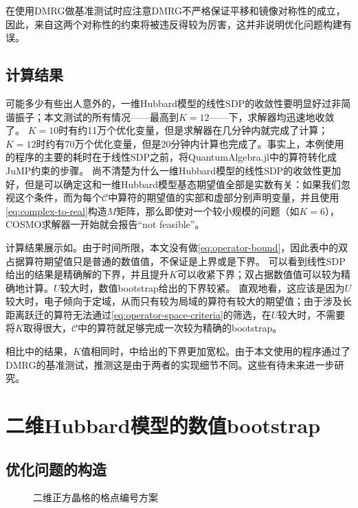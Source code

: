 \documentclass[oneside]{fduthesis}
\begin{document}
在使用DMRG做基准测试时应注意DMRG不严格保证平移和镜像对称性的成立，因此，来自这两个对称性的约束将被违反得较为厉害，这并非说明优化问题构建有误。

\subsection{计算结果}

可能多少有些出人意外的，一维Hubbard模型的线性SDP的收敛性要明显好过非简谐振子；本文测试的所有情况——最高到$K=12$——下，求解器均迅速地收敛了。
$K=10$时有约11万个优化变量，但是求解器在几分钟内就完成了计算；$K=12$时约有70万个优化变量，但是20分钟内计算也完成了。事实上，本例使用的程序的主要的耗时在于线性SDP之前，将QuantumAlgebra.jl中的算符转化成JuMP约束的步骤。
尚不清楚为什么一维Hubbard模型的线性SDP的收敛性更加好，但是可以确定这和一维Hubbard模型基态期望值全部是实数有关：如果我们忽视这个条件，而为每个$\mathcal{C}$中算符的期望值的实部和虚部分别声明变量，并且使用\eqref{eq:complex-to-real}构造$M$矩阵，那么即使对一个较小规模的问题（如$K=6$），COSMO求解器一开始就会报告“not feasible”。



计算结果展示如。由于时间所限，本文没有做\eqref{eq:operator-bound}，因此表中的双占据算符期望值只是普通的数值值，不保证是上界或是下界。
可以看到线性SDP给出的结果是精确解的下界，并且提升$K$可以收紧下界；双占据数值值可以较为精确地计算。$U$较大时，数值bootstrap给出的下界较紧。
直观地看，这应该是因为$U$较大时，电子倾向于定域，从而只有较为局域的算符有较大的期望值；由于涉及长距离跃迁的算符无法通过\eqref{eq:operator-space-criteria}的筛选，在$U$较大时，不需要将$K$取得很大，$\mathcal{C}$中的算符就足够完成一次较为精确的bootstrap。

相比\parencite{han_manybody}中的结果，$K$值相同时，中给出的下界更加宽松。由于本文使用的程序通过了DMRG的基准测试，推测这是由于两者的实现细节不同。这些有待未来进一步研究。

\section{二维Hubbard模型的数值bootstrap}

\subsection{优化问题的构造}

\begin{figure}
    \centering
    
    \caption{二维正方晶格的格点编号方案}
    \label{fig:site-index-2d}
\end{figure}
\end{document}
